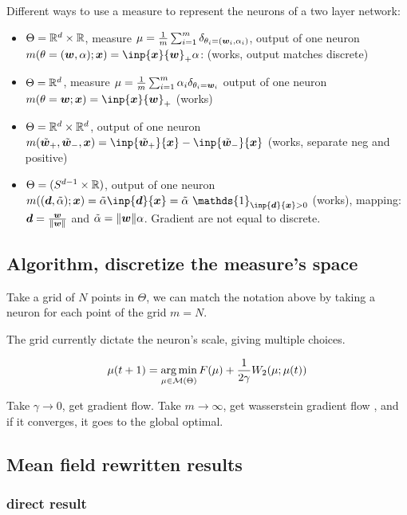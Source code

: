Different ways to use a measure to represent the neurons of a two layer network:

\begin{itemize}
	\item $\Theta = \mathbb{R}^d \times \mathbb{R}$, measure $\mu = \frac{1}{m} \sum_{i=1}^{m} \delta_{\theta_i = ({\bm{w}}_i, \alpha_i)}$, output of one neuron $m(\theta=(\vw,\alpha); \vx) = \inp{\vx}{\vw}_+ \alpha$: (works, output matches discrete)
	\item $\Theta = \mathbb{R}^d$, measure $\mu = \frac{1}{m} \sum_{i=1}^{m} \alpha_i \delta_{\theta_i = {\bm{w}}_i}$ output of one neuron $m(\theta=\vw; \vx) = \inp{\vx}{\vw}_+$ (works)
	\item $\Theta = \mathbb{R}^d \times \mathbb{R}^d$, output of one neuron $m(\tilde{\vw}_+, \tilde{\vw}_-, \vx) = \inp{\tilde{\vw}_+}{\vx} - \inp{\tilde{\vw}_-}{\vx}$ (works, separate neg and positive)
	\item $\Theta = (S^{d-1} \times \mathbb{R})$, output of one neuron $m((\vd, \tilde{\alpha}); \vx) = \tilde{\alpha} \inp{\vd}{\vx} = \tilde{\alpha}\  \mathds{1}_{\inp{\vd}{\vx}>0} $ (works), mapping: ${\bm{d}} = \frac{{\bm{w}}}{\lVert{\bm{w}}\rVert}$ and $\tilde{\alpha}=\lVert{\bm{w}}\rVert \alpha$. Gradient are not equal to discrete.
\end{itemize}

\subsection{Algorithm, discretize the measure's space}

Take a grid of $N$ points in $\Theta$, we can match the notation above by taking a neuron for each point of the grid $m=N$.

The grid currently dictate the neuron's scale, giving multiple choices.

\begin{equation}
	\mu(t+1) = \operatorname*{arg\,min}_{\mu \in \mathcal{M}(\Theta)} F(\mu) + \frac{1}{2 \gamma} W_2(\mu; \mu(t))
\end{equation}



Take $\gamma \to 0$, get gradient flow. Take $m \to \infty$, get wasserstein gradient flow \citep{bachGradientDescentInfinitely2021}, and if it converges, it goes to the global optimal.

\subsection{Mean field rewritten results}
\subsubsection{direct result}

